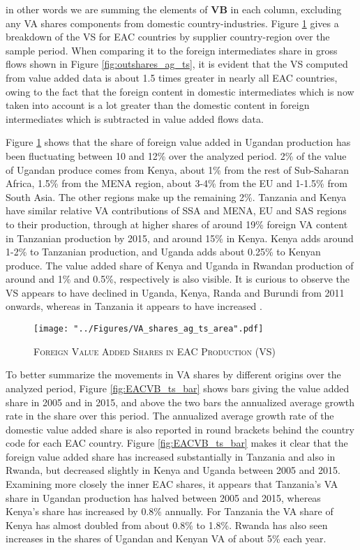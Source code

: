 \documentclass[a4paper]{article}
\begin{document}
in other words we are summing the elements of \textbf{VB} in each column, excluding any VA shares components from domestic country-industries. Figure \ref{fig:EACVB_ts} gives a breakdown of the VS for EAC countries by supplier country-region over the sample period. When comparing it to the foreign intermediates share in gross flows shown in Figure \ref{fig:outshares_ag_ts}, it is evident that the VS computed from value added data is about 1.5 times greater in nearly all EAC countries, owing to the fact that the foreign content in domestic intermediates which is now taken into account is a lot greater than the domestic content in foreign intermediates which is subtracted in value added flows data. \newline

Figure \ref{fig:EACVB_ts} shows that the share of foreign value added in Ugandan production has been fluctuating between 10 and 12\% over the analyzed period. 2\% of the value of Ugandan produce comes from Kenya, about 1\% from the rest of Sub-Saharan Africa, 1.5\% from the MENA region, about 3-4\% from the EU and 1-1.5\% from South Asia. The other regions make up the remaining 2\%. Tanzania and Kenya have similar relative VA contributions of SSA and MENA, EU and SAS regions to their production, through at higher shares of around 19\% foreign VA content in Tanzanian production by 2015, and around 15\% in Kenya. Kenya adds around 1-2\% to Tanzanian production, and Uganda adds about 0.25\% to Kenyan produce. The value added share of Kenya and Uganda in Rwandan production of around and 1\% and 0.5\%, respectively is also visible. It is curious to observe the VS appears to have declined in Uganda, Kenya, Randa and Burundi from 2011 onwards, whereas in Tanzania it appears to have increased .

\begin{figure}[h!]
\centering
\caption{\label{fig:EACVB_ts}\textsc{Foreign Value Added Shares in EAC Production (VS)}}
\texttt{[image: "../Figures/VA\_shares\_ag\_ts\_area".pdf]} %
\end{figure}
\FloatBarrier

To better summarize the movements in VA shares by different origins over the analyzed period, Figure \ref{fig:EACVB_ts_bar} shows  bars giving the value added share in 2005 and in 2015, and above the two bars the annualized average growth rate in the share over this period. The annualized average growth rate of the domestic value added share is also reported in round brackets behind the country code for each EAC country. Figure \ref{fig:EACVB_ts_bar} makes it clear that the foreign value added share has increased substantially in Tanzania and also in Rwanda, but decreased slightly in Kenya and Uganda between 2005 and 2015.  Examining more closely the inner EAC shares, it appears that Tanzania's VA share in Ugandan production has halved between 2005 and 2015, whereas Kenya's share has increased by 0.8\% annually. For Tanzania the VA share of Kenya has almost doubled from about 0.8\% to 1.8\%. Rwanda has also seen increases in the shares of Ugandan and Kenyan VA of about 5\% each year. 
\end{document}
